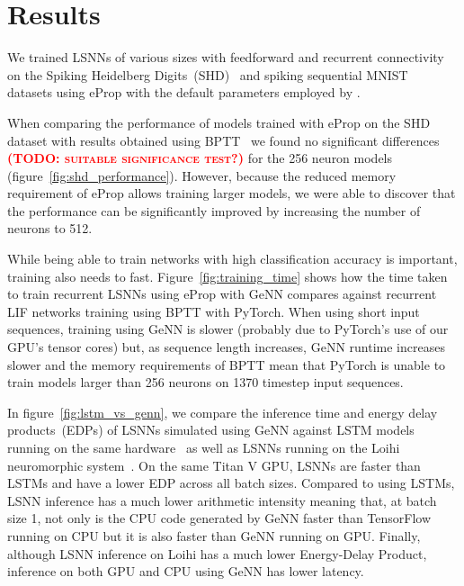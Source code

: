 \documentclass[sigconf,authordraft]{acmart}
\newcommand{\todo}[1]{\textbf{\textsc{\textcolor{red}{(TODO: #1)}}}}
\begin{document}
\section{Results}
We trained LSNNs of various sizes with feedforward and recurrent connectivity on the Spiking Heidelberg Digits~(SHD)~\citep{Cramer2020} and spiking sequential MNIST~\citep{Plank2021} datasets using eProp with the default parameters employed by \citet{Bellec2020}.

When comparing the performance of models trained with eProp on the SHD dataset with results obtained using BPTT~\citep{Zenke2021a} we found no significant differences \todo{suitable significance test?} for the \num{256} neuron models (figure~\ref{fig:shd_performance}). 
However, because the reduced memory requirement of eProp allows training larger models, we were  able to discover that the performance can be significantly improved by increasing the number of neurons to \num{512}.

While being able to train networks with high classification accuracy is important, training also needs to fast.
Figure~\ref{fig:training_time} shows how the time taken to train recurrent LSNNs using eProp with GeNN compares against recurrent LIF networks training using BPTT with PyTorch.
When using short input sequences, training using GeNN is slower (probably due to PyTorch's use of our GPU's tensor cores) but, as sequence length increases, GeNN runtime increases slower and the memory requirements of BPTT mean that PyTorch is unable to train models larger than \num{256} neurons on \num{1370} timestep input sequences.

In figure~\ref{fig:lstm_vs_genn}, we compare the inference time and energy delay products~(EDPs) of LSNNs simulated using GeNN against LSTM models running on the same hardware~\citep{Plank2021} as well as LSNNs running on the Loihi neuromorphic system~\citep{Davies2018}.
On the same Titan V GPU, LSNNs are faster than LSTMs and have a lower EDP across all batch sizes.
Compared to using LSTMs, LSNN inference has a much lower arithmetic intensity meaning that, at batch size 1, not only is the CPU code generated by GeNN faster than TensorFlow running on CPU but it is also faster than GeNN running on GPU.
Finally, although LSNN inference on Loihi has a much lower Energy-Delay Product, inference on both GPU and CPU using GeNN has lower latency.
\end{document}
